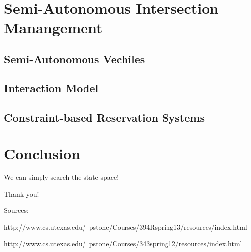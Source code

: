 \documentclass{beamer}
\begin{document}
\section{Semi-Autonomous Intersection Manangement}

\subsection{Semi-Autonomous Vechiles}

\subsection{Interaction Model}

\subsection{Constraint-based Reservation Systems}

\section{Conclusion}

\begin{frame}{We can simply search the state space!}
\end{frame}

\begin{frame}
\large{Thank you!}

\hfill
\hfill
\hfill

\tiny{Sources:

http://www.cs.utexas.edu/~pstone/Courses/394Rspring13/resources/index.html

http://www.cs.utexas.edu/~pstone/Courses/343spring12/resources/index.html}
\end{frame}
\end{document}
